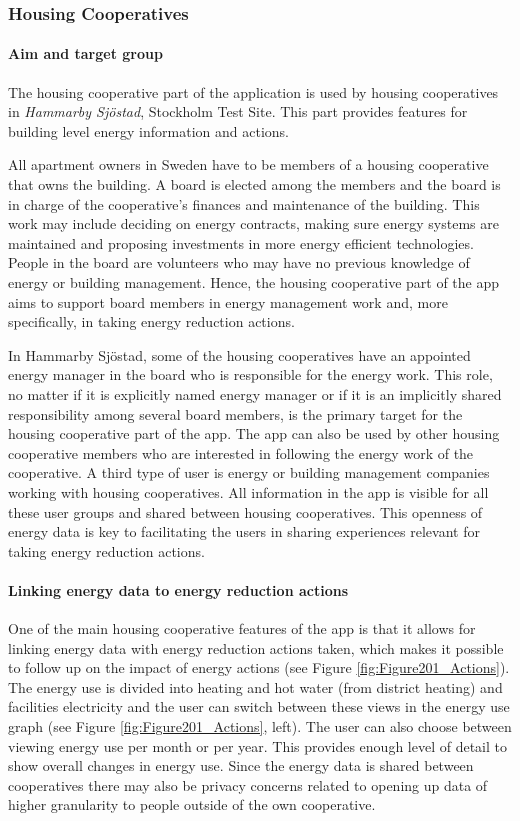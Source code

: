 \subsubsection{Housing Cooperatives}
\label{sec:brf}

\paragraph{Aim and target group}

The housing cooperative part of the application is used by housing cooperatives in \textit{Hammarby Sj{\"o}stad}, Stockholm Test Site. This part provides features for building level energy information and actions. 

 All apartment owners in Sweden have to be members of a housing cooperative that owns the building. A board is elected among the members and the board is in charge of the cooperative's finances and maintenance of the building. This work may include deciding on energy contracts, making sure energy systems are maintained and proposing investments in more energy efficient technologies. People in the board are volunteers who may have no previous knowledge of energy or building management. Hence, the housing cooperative part of the app aims to support board members in energy management work and, more specifically, in taking energy reduction actions.

In Hammarby Sj{\"o}stad, some of the housing cooperatives have an appointed energy manager in the board who is responsible for the energy work. This role, no matter if it is explicitly named energy manager or if it is an implicitly shared responsibility among several board members, is the primary target for the housing cooperative part of the app. The app can also be used by other housing cooperative members who are interested in following the energy work of the cooperative. A third type of user is energy or building management companies working with housing cooperatives. All information in the app is visible for all these user groups and shared between housing cooperatives. This openness of energy data is key to facilitating the users in sharing experiences relevant for taking energy reduction actions.

\paragraph{Linking energy data to energy reduction actions}

One of the main housing cooperative features of the app is that it allows for linking energy data with energy reduction actions taken, which makes it possible to follow up on the impact of energy actions (see Figure \ref{fig:Figure201_Actions}). The energy use is divided into heating and hot water (from district heating) and facilities electricity and the user can switch between these views in the energy use graph (see Figure \ref{fig:Figure201_Actions}, left). The user can also choose between viewing energy use per month or per year. This provides enough level of detail to show overall changes in energy use. Since the energy data is shared between cooperatives there may also be privacy concerns related to opening up data of higher granularity to people outside of the own cooperative. 

